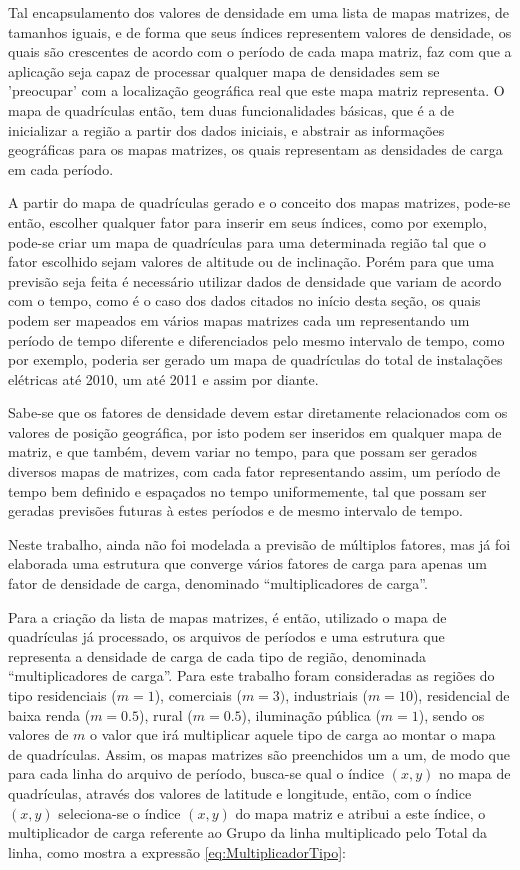 Tal encapsulamento dos valores de densidade em uma lista de mapas matrizes, de tamanhos iguais, e de forma que seus índices representem valores de densidade, os quais são crescentes de acordo com o período de cada mapa matriz, faz com que a aplicação seja capaz de processar qualquer mapa de densidades sem se 'preocupar' com a localização geográfica real que este mapa matriz representa. O mapa de quadrículas então, tem duas funcionalidades básicas, que é a de inicializar a região a partir dos dados iniciais, e abstrair as informações geográficas para os mapas matrizes, os quais representam as densidades de carga em cada período.

A partir do mapa de quadrículas gerado e o conceito dos mapas matrizes, pode-se então, escolher qualquer fator para inserir em seus índices, como por exemplo, pode-se criar um mapa de quadrículas para uma determinada região tal que o fator escolhido sejam valores de altitude ou de inclinação. Porém para que uma previsão seja feita é necessário utilizar dados de densidade que variam de acordo com o tempo, como é o caso dos dados citados no início desta seção, os quais podem ser mapeados em vários mapas matrizes cada um representando um período de tempo diferente e diferenciados pelo mesmo intervalo de tempo, como por exemplo, poderia ser gerado um mapa de quadrículas do total de instalações elétricas até 2010, um até 2011 e assim por diante.

Sabe-se que os fatores de densidade devem estar diretamente relacionados com os valores de posição geográfica, por isto podem ser inseridos em qualquer mapa de matriz, e que também, devem variar no tempo, para que possam ser gerados diversos mapas de matrizes, com cada fator representando assim, um período de tempo bem definido e espaçados no tempo uniformemente, tal que possam ser geradas previsões futuras à estes períodos e de mesmo intervalo de tempo.

Neste trabalho, ainda não foi modelada a previsão de múltiplos fatores, mas já foi elaborada uma estrutura que converge vários fatores de carga para apenas um fator de densidade de carga, denominado “multiplicadores de carga”.

Para a criação da lista de mapas matrizes, é então, utilizado o mapa de quadrículas já processado, os arquivos de períodos e uma estrutura que representa a densidade de carga de cada tipo de região, denominada “multiplicadores de carga”. Para este trabalho foram consideradas as regiões do tipo residenciais (\(m=1\)), comerciais (\(m=3)\), industriais (\(m=10\)), residencial de baixa renda (\(m=0.5\)), rural (\(m=0.5\)), iluminação pública (\(m=1\)), sendo os valores de \(m\) o valor que irá multiplicar aquele tipo de carga ao montar o mapa de quadrículas. Assim, os mapas matrizes são preenchidos um a um, de modo que para cada linha do arquivo de período, busca-se qual o índice \((x,y)\) no mapa de quadrículas, através dos valores de latitude e longitude, então, com o índice \((x,y)\) seleciona-se o índice \((x,y)\) do mapa matriz e atribui a este índice, o multiplicador de carga referente ao Grupo da linha multiplicado pelo Total da linha, como mostra a expressão \ref{eq:MultiplicadorTipo}:

